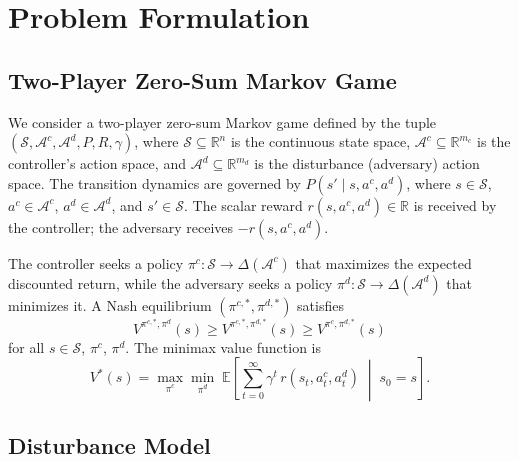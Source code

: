 \documentclass[conference]{IEEEtran}
\newcommand{\E}{\mathbb{E}}
\newcommand{\R}{\mathbb{R}}
\newcommand{\cS}{\mathcal{S}}
\newcommand{\cA}{\mathcal{A}}
\begin{document}
\section{Problem Formulation}\label{sec:formulation}

\subsection{Two-Player Zero-Sum Markov Game}

We consider a two-player zero-sum Markov game defined by the tuple
$(\cS, \cA^c, \cA^d, P, R, \gamma)$, where $\cS \subseteq \R^n$ is the
continuous state space, $\cA^c \subseteq \R^{m_c}$ is the controller's
action space, and $\cA^d \subseteq \R^{m_d}$ is the disturbance
(adversary) action space.  The transition dynamics are governed by
$P(s' \mid s, a^c, a^d)$, where $s \in \cS$, $a^c \in \cA^c$,
$a^d \in \cA^d$, and $s' \in \cS$.  The scalar reward
$r(s, a^c, a^d) \in \R$ is received by the controller; the adversary
receives $-r(s, a^c, a^d)$.

The controller seeks a policy $\pi^c: \cS \to \Delta(\cA^c)$ that
maximizes the expected discounted return, while the adversary seeks a
policy $\pi^d: \cS \to \Delta(\cA^d)$ that minimizes it.  A Nash
equilibrium $(\pi^{c,*}, \pi^{d,*})$ satisfies
\begin{equation}\label{eq:nash_formal}
V^{\pi^{c,*}, \pi^d}(s) \geq V^{\pi^{c,*}, \pi^{d,*}}(s) \geq
V^{\pi^c, \pi^{d,*}}(s)
\end{equation}
for all $s \in \cS$, $\pi^c$, $\pi^d$.  The minimax value function is
\begin{equation}\label{eq:minimax_formal}
V^*(s) = \max_{\pi^c} \min_{\pi^d} \;\E\!\left[
  \sum_{t=0}^{\infty} \gamma^t\, r(s_t, a_t^c, a_t^d)
  \;\middle|\; s_0 = s\right].
\end{equation}

\subsection{Disturbance Model}\label{sec:disturbance_model}
\end{document}
